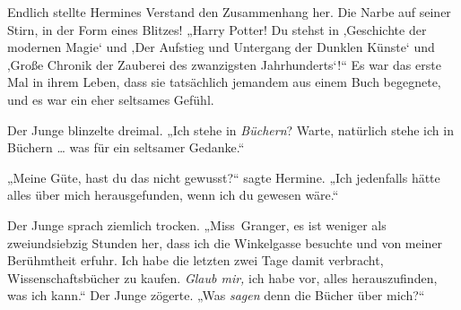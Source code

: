 Endlich stellte Hermines Verstand den Zusammenhang her. Die Narbe auf seiner Stirn, in der Form eines Blitzes!
„Harry Potter! Du stehst in ‚Geschichte der modernen Magie‘ und ‚Der Aufstieg und Untergang der Dunklen Künste‘ und ‚Große Chronik der Zauberei des zwanzigsten Jahrhunderts‘!“ Es war das erste Mal in ihrem Leben, dass sie tatsächlich jemandem aus einem Buch begegnete, und es war ein eher seltsames Gefühl.

Der Junge blinzelte dreimal.
„Ich stehe in \emph{Büchern}? Warte, natürlich stehe ich in Büchern … was für ein seltsamer Gedanke.“

„Meine Güte, hast du das nicht gewusst?“ sagte Hermine.
„Ich jedenfalls hätte alles über mich herausgefunden, wenn ich du gewesen wäre.“

Der Junge sprach ziemlich trocken.
„Miss~Granger, es ist weniger als zweiundsiebzig Stunden her, dass ich die Winkelgasse besuchte und von meiner Berühmtheit erfuhr. Ich habe die letzten zwei Tage damit verbracht, Wissenschaftsbücher zu kaufen. \emph{Glaub mir,} ich habe vor, alles herauszufinden, was ich kann.“ Der Junge zögerte.
„Was \emph{sagen} denn die Bücher über mich?“


